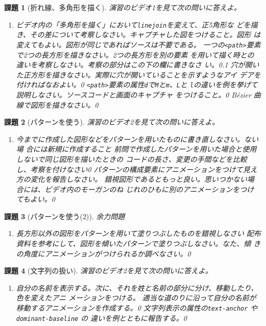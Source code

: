 \documentclass[a4j]{jreport}
\newtheorem{Report}{課題}
\newcommand{\Probs}[3]{%
 \begin{Report}[#1]\upshape
  #2
  \begin{enumerate}\upshape
  \ShowProbs#3\relax\relax
  \end{enumerate}
 \end{Report}
 }
\newcommand{\ShowProbs}[2]{\ifx#1\relax\else%
 \item #1\vspace{#2\textheight}\expandafter\ShowProbs\fi}
\begin{document}
\Probs{折れ線、多角形を描く}{演習のビデオ1を見て次の問いに答えよ。}{
{ビデオ内の「多角形を描く」において\texttt{linejoin}を変えて、正5角形な
どを描き、その差について考察しなさい。キャプチャした図をつけること。図形
は変えてもよい。図形が同じであればソースは不要である。}{0}
{一つの\Verb+<path>+要素で2つの長方形を描きなさい。2つの長方形を別の要素
を用いて描く時との違いを考察しなさい。考察の部分はこの下の欄に書きなさ
い。}{0.1}
{穴が開いた正方形を描きなさい。実際に穴が開いていることを示すようなアイ
デアを付ければなおよい。}{0}
{\Verb+<path>+要素の属性\texttt{d}で\texttt{M}と\texttt{m}、\texttt{L}と
\texttt{l}の違いを例を挙げて説明しなさい。ソースコードと画面のキャプチャ
をつけること。}{0}
{B\'ezier 曲線で図形を描きなさい。}{0}
}
\Probs{パターンを使う}{演習のビデオ2を見て次の問いに答えよ。}{
{今までに作成した図形などをパターンを用いたものに書き直しなさい。ない場
合には新規に作成すること}{0}
{前問で作成したパターンを用いた場合と使用しないで同じ図形を描いたときの
コードの長さ、変更の手間などを比較し、考察を付けなさい}{0}
{パターンの構成要素にアニメーションをつけて見え方の変化を報告しなさい。
錯視図形であるともっと良い。思いつかない場合には、ビデオ内のモーガンのね
じれのひもに別のアニメーションをつけてもよい。}{0}
}
\Probs{パターンを使う(2)}{余力問題}{
{長方形以外の図形をパターンを用いて塗りつぶしたものを錯視しなさい}{0}
{配布資料を参考にして、図形を傾いたパターンで塗りつぶしなさい。なた、傾
きの角度にアニメーションがつけられるか調べなさい。}{0}
}
\Probs{文字列の扱い}{演習のビデオ2を見て次の問いに答えよ。}{
{自分の名前を表示する。次に、それを姓と名前の部分に分け、移動したり、色を変えたアニ
メーションをつける。}{0}
{適当な道のりに沿って自分の名前が移動するアニメーションを作成する。}{0}
{文字列表示の属性の\texttt{text-anchor} や\texttt{dominant-baseline} の
違いを例とともに報告する。}{0}}
\end{document}
